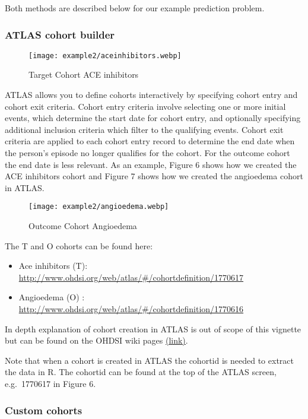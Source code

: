 \documentclass[
]{article}
\providecommand{\tightlist}{%
  \setlength{\itemsep}{0pt}\setlength{\parskip}{0pt}}
\begin{document}
Both methods are described below for our example prediction problem.

\hypertarget{atlas-cohort-builder-1}{%
\subsubsection{ATLAS cohort builder}\label{atlas-cohort-builder-1}}

\begin{figure}
\centering
\texttt{[image: example2/aceinhibitors.webp]}
\caption{Target Cohort ACE inhibitors}
\end{figure}

ATLAS allows you to define cohorts interactively by specifying cohort
entry and cohort exit criteria. Cohort entry criteria involve selecting
one or more initial events, which determine the start date for cohort
entry, and optionally specifying additional inclusion criteria which
filter to the qualifying events. Cohort exit criteria are applied to
each cohort entry record to determine the end date when the person's
episode no longer qualifies for the cohort. For the outcome cohort the
end date is less relevant. As an example, Figure 6 shows how we created
the ACE inhibitors cohort and Figure 7 shows how we created the
angioedema cohort in ATLAS.

\begin{figure}
\centering
\texttt{[image: example2/angioedema.webp]}
\caption{Outcome Cohort Angioedema}
\end{figure}

The T and O cohorts can be found here:

\begin{itemize}
\tightlist
\item
  Ace inhibitors (T):
  \url{http://www.ohdsi.org/web/atlas/\#/cohortdefinition/1770617}
\item
  Angioedema (O) :
  \url{http://www.ohdsi.org/web/atlas/\#/cohortdefinition/1770616}
\end{itemize}

In depth explanation of cohort creation in ATLAS is out of scope of this
vignette but can be found on the OHDSI wiki pages
\href{http://www.ohdsi.org/web/wiki/doku.php?id=documentation:software:atlas}{(link)}.

Note that when a cohort is created in ATLAS the cohortid is needed to
extract the data in R. The cohortid can be found at the top of the ATLAS
screen, e.g.~1770617 in Figure 6.

\hypertarget{custom-cohorts-1}{%
\subsubsection{Custom cohorts}\label{custom-cohorts-1}}
\end{document}
